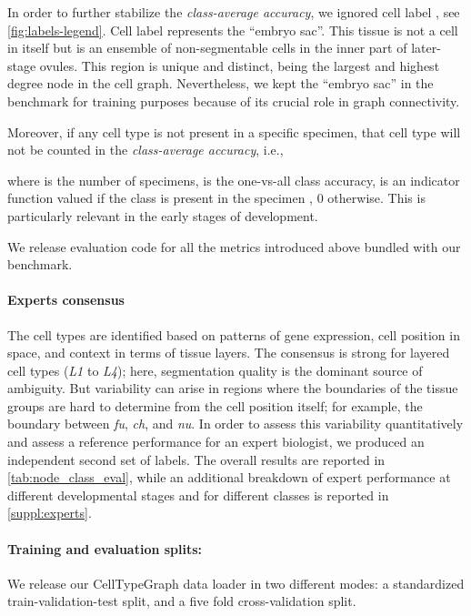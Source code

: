 \documentclass[10pt,twocolumn,letterpaper]{article}
\begin{document}
In order to further stabilize the \textit{class-average accuracy}, we ignored cell label , see \cref{fig:labels-legend}.
Cell label  represents the ``embryo sac''. This tissue is not a cell in itself but is an ensemble of non-segmentable cells in the inner part of later-stage ovules. This region is unique and distinct, being the largest and highest degree node in the cell graph. Nevertheless, we kept the ``embryo sac'' in the benchmark for training purposes because of its crucial role in graph connectivity.

Moreover, if any cell type is not present in a specific specimen, that cell type will not be counted in the \textit{class-average accuracy}, i.e.,

where  is the number of specimens,  is the one-vs-all class accuracy,  is an indicator function valued  if the class  is present in the specimen , 0 otherwise. This is particularly relevant in the early stages of development.

We release evaluation code for all the metrics introduced above bundled with our benchmark.

\paragraph{Experts consensus}
The cell types are identified based on patterns of gene expression, cell position in space, and context in terms of tissue layers. The consensus is strong for layered cell types (\textit{L1} to \textit{L4}); here, segmentation quality is the dominant source of ambiguity. But variability can arise in regions where the boundaries of the tissue groups are hard to determine from the cell position itself; for example, the boundary between \textit{fu}, \textit{ch}, and \textit{nu}.
In order to assess this variability quantitatively and assess a reference performance for an expert biologist, we produced an independent second set of labels.
The overall results are reported in \cref{tab:node_class_eval}, while an additional breakdown of expert performance at different developmental stages and for different classes is reported in \cref{suppl:experts}.

\paragraph{Training and evaluation splits:} We release our CellTypeGraph data loader in two different modes: a standardized train-validation-test split, and a five fold cross-validation split.
\end{document}
